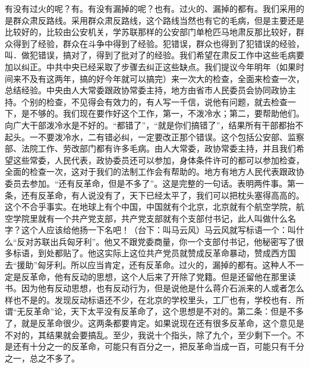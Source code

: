 有没有过火的呢？有。有没有漏掉的呢？也有。过火的、漏掉的都有。我们采用的是群众肃反路线。采用群众肃反路线，这个路线当然也有它的毛病，但是主要还是比较好的，比较由公安机关，学苏联那样的公安部门单枪匹马地肃反那比较好，群众得到了经验，群众在斗争中得到了经验。犯错误，群众也得到了犯错误的经验，叫．做犯错误，搞对了，得到了批对了的经验。我们希望在肃反工作中这些毛病要加以纠正。中共中央已经采取了步骤去纠正这些缺点。我们提议今年明年（如果时间来不及有这两年，搞的好今年就可以搞完）来一次大的检查，全面来检查一次，总结经验。中央由人大常委跟政协常委主持，地方由省市人民委员会协同政协主持。个别的检查，不见得会有效力的，有人写一千信，说他有问题，就去检查一下，是不够的。我们现在要作好这个工作，第一，不泼冷水；第二，要帮助他们。向广大干部泼冷水是不好的。“都错了”，“就是你们搞错了”，结果所有干部都抬不起头。一不要泼冷水，二有错必纠，一定要改正那个错误。这个包括公安部、监察部、法院工作、劳改部门都有许多毛病。由人大常委，政协常委主持，并且我们希望这些常委，人民代表，政协委员还可以参加，身体条件许可的都可以参加检查，全面的检查一次，这对于我们的法制工作会有帮助的。地方有地方人民代表跟政协委员去参加。“还有反革命，但是不多了”。这是完整的一句话。表明两件事。第一条，还有反革命，有人说没有了，天下已经太平了，我们可以把枕头塞得高高的。这个不合乎事实。在地球上有个中国，中国就有个北京，北京就有个航空学院，航空学院里就有一个共产党支部，共产党支部就有个支部付书记，此人叫做什么名字？这个人应该给他扬一下名吧！（台下：叫马云风）马云风就写标语一个：叫什么“反对苏联出兵匈牙利”。他又不跟党委商量，你一个支部付书记，他秘密写了很多标语，到处都贴了。他这实际上这位共产党员就赞成反革命暴动，赞成西方国去“援助”匈牙利。所以应当肯定，还有反革命。过火的，漏掉的都有。这种人不一定是反革命，他有反动的思想，这个人后来了开除了党籍。但是还留他在那里读书。因为他有反动思想，也有反动行为，但是说他是什么蒋介石派来的人或者怎么样也不是的。发现反动标语还不少，在北京的学校里头，工厂也有，学校也有．所谓“无反革命”论，天下太平没有反革命了，这个思想是不对的。第二条：但是不多了，就是反革命很少。这两条都要肯定。如果说现在还有很多反革命，这个意见是不对的，其结果就会要搞乱。至少，我说十个指头，除了九个，至少剩下一个。不是还有十分之一的反革命，可能只有百分之一，把反革命当成一百，可能只有千分之一，总之不多了。

